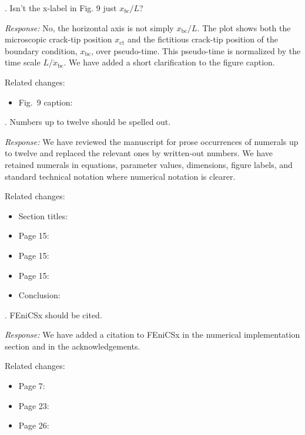 \documentclass[pdflatex,sn-mathphys-num]{sn-jnl}
\begin{document}
. Isn't the x-label in Fig. 9 just $x_{bc}/L$?

\emph{Response:} No, the horizontal axis is not simply $x_{\mathrm{bc}}/L$. The plot shows both the microscopic crack-tip position $x_{\mathrm{ct}}$ and the fictitious crack-tip position of the boundary condition, $x_{\mathrm{bc}}$, over pseudo-time. This pseudo-time is normalized by the time scale $L/\dot{x}_{\mathrm{bc}}$. We have added a short clarification to the figure caption.

Related changes:
\begin{itemize}
\item Fig.~9 caption: 
\end{itemize}

\bigskip

. Numbers up to twelve should be spelled out.

\emph{Response:} We have reviewed the manuscript for prose occurrences of numerals up to twelve and replaced the relevant ones by written-out numbers. We have retained numerals in equations, parameter values, dimensions, figure labels, and standard technical notation where numerical notation is clearer.

Related changes:
\begin{itemize}
\item Section titles:  
\item Page 15:  
\item Page 15:  
\item Page 15:  
\item Conclusion:  
\end{itemize}

\bigskip

. FEniCSx should be cited.

\emph{Response:} We have added a citation to FEniCSx in the numerical implementation section and in the acknowledgements.

Related changes:
\begin{itemize}
\item Page 7: 
\item Page 23:  
\item Page 26: 
\end{itemize}
\end{document}
